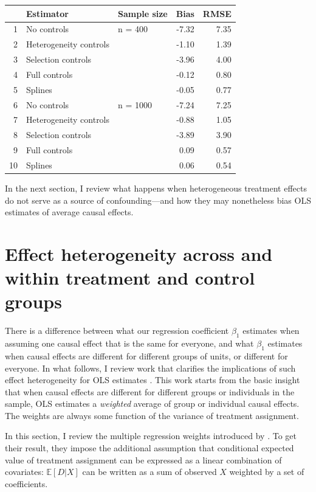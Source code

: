 \documentclass[hidelinks,11pt]{article}
\begin{document}
\begin{table}[ht]
\centering
\begin{tabular}{rllrr}
  \hline
 & Estimator & Sample size & Bias & RMSE \\
  \hline
1 & No controls & n = 400 & -7.32 & 7.35 \\
  2 & Heterogeneity controls &  & -1.10 & 1.39 \\
  3 & Selection controls &  & -3.96 & 4.00 \\
  4 & Full controls &  & -0.12 & 0.80 \\
  5 & Splines &  & -0.05 & 0.77 \\
  6 & No controls & n = 1000 & -7.24 & 7.25 \\
  7 & Heterogeneity controls &  & -0.88 & 1.05 \\
  8 & Selection controls &  & -3.89 & 3.90 \\
  9 & Full controls &  & 0.09 & 0.57 \\
  10 & Splines &  & 0.06 & 0.54 \\
   \hline

\end{tabular}

\end{table}

In the next section, I review what happens when heterogeneous treatment effects do not serve as a source of confounding---and how they may nonetheless bias OLS estimates of average causal effects.

\section{Effect heterogeneity across and within treatment and control groups}

There is a difference between what our regression coefficient $\beta_1$ estimates when assuming one causal effect that is the same for everyone, and what $\beta_1$ estimates when causal effects are different for different groups of units, or different for everyone. In what follows, I review work that clarifies the implications of such effect heterogeneity for OLS estimates \citep{aronowsamii2016}. This work starts from the basic insight that when causal effects are different for different groups or individuals in the sample, OLS estimates a \emph{weighted} average of group or individual causal effects. The weights are always some function of the variance of treatment assignment.

In this section, I review the multiple regression weights introduced by \citet{aronowsamii2016}. To get their result, they impose the additional assumption that conditional expected value of treatment assignment can be expressed as a linear combination of covariates: $\mathbb{E}[D|X]$ can be written as a sum of observed $X$ weighted by a set of coefficients.
\end{document}
